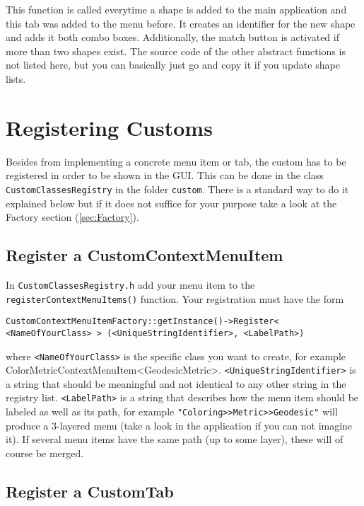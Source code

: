 This function is called everytime a shape is added to the main application and this tab was added to the menu before. It creates an identifier for the new shape and adds it both combo boxes. Additionally, the match button is activated if more than two shapes exist. The source code of the other abstract functions is not listed here, but you can basically just go and copy it if you update shape lists. 

\section{Registering Customs}
\label{sec:RegisterCustoms}

Besides from implementing a concrete menu item or tab, the custom has to be registered in order to be shown in the GUI. This can be done in the class \texttt{CustomClassesRegistry} in the folder \texttt{custom}. There is a standard way to do it explained below but if it does not suffice for your purpose take a look at the Factory section (\ref{sec:Factory}).

\subsection{Register a CustomContextMenuItem}
\label{subsec:RegisterMenuItem}

In \texttt{CustomClassesRegistry.h} add your menu item to the \texttt{registerContextMenuItems()} function. Your registration must have the form 

\texttt{CustomContextMenuItemFactory::getInstance()->Register< <NameOfYourClass> > \linebreak
	\hspace*{2ex}(<UniqueStringIdentifier>, <LabelPath>)}
	
where \texttt{<NameOfYourClass>} is the specific class you want to create, for example ColorMetricContextMenuItem<GeodesicMetric>. \texttt{<UniqueStringIdentifier>} is a string that should be meaningful and not identical to any other string in the registry list. \texttt{<LabelPath>} is a string that describes how the menu item should be labeled as well as its path, for example \texttt{"Coloring>>Metric>>Geodesic"} will produce a 3-layered menu (take a look in the application if you can not imagine it). If several menu items have the same path (up to some layer), these will of course be merged.

\subsection{Register a CustomTab}
\label{subsec:RegisterTab}

